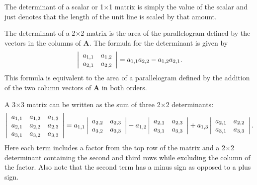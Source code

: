The determinant of a scalar or 1$\times$1 matrix is simply the value of the scalar and just denotes that the length of the unit line is scaled by that amount.

The determinant of a 2$\times$2 matrix is the area of the parallelogram defined by the vectors in the columns of $\mathbf{A}$. The formula for the determinant is given by
\begin{align} \label{Eqn:linearAlgebra_2x2Determinant}
  \left| \begin{array}{c c} a_{1,1} & a_{1,2} \\ a_{2,1} & a_{2,2} \\ \end{array} \right| = a_{1,1} a_{2,2} - a_{1,2} a_{2,1}.
\end{align}
This formula is equivalent to the area of a parallelogram defined by the addition of the two column vectors of $\mathbf{A}$ in both orders.

A 3$\times$3 matrix can be written as the sum of three 2$\times$2 determinants:
\begin{align}
  \left| \begin{array}{c c c} a_{1,1} & a_{1,2} & a_{1,3} \\ a_{2,1} & a_{2,2} & a_{2,3} \\ a_{3,1} & a_{3,2} & a_{3,3} \\ \end{array} \right| 
  = a_{1,1} \left| \begin{array}{c c} a_{2,2} & a_{2,3} \\ a_{3,2} & a_{3,3} \\ \end{array} \right|
  - a_{1,2} \left| \begin{array}{c c} a_{2,1} & a_{2,3} \\ a_{3,1} & a_{3,3} \\ \end{array} \right|
  + a_{1,3} \left| \begin{array}{c c} a_{2,1} & a_{2,2} \\ a_{3,1} & a_{3,3} \\ \end{array} \right| .
\end{align}
Here each term includes a factor from the top row of the matrix and a 2$\times$2 determinant containing the second and third rows while excluding the column of the factor. Also note that the second term has a minus sign as opposed to a plus sign.


